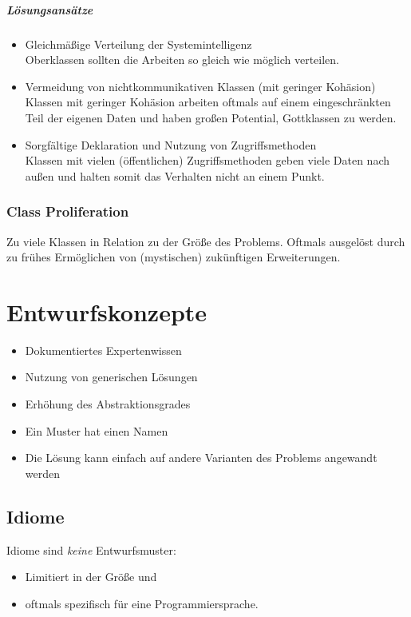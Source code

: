 \documentclass[a4paper, 11pt, accentcolor = tud3b]{tudreport}
\begin{document}
				\paragraph{Lösungsansätze}
					\begin{itemize}
						\item Gleichmäßige Verteilung der Systemintelligenz \\
							  Oberklassen sollten die Arbeiten so gleich wie möglich verteilen.
						\item Vermeidung von nichtkommunikativen Klassen (mit geringer Kohäsion) \\
							  Klassen mit geringer Kohäsion arbeiten oftmals auf einem eingeschränkten Teil der eigenen Daten und haben großen Potential, Gottklassen zu werden.
						\item Sorgfältige Deklaration und Nutzung von Zugriffsmethoden \\
							  Klassen mit vielen (öffentlichen) Zugriffsmethoden geben viele Daten nach außen und halten somit das Verhalten nicht an einem Punkt.
					\end{itemize}
			
			\subsection{Class Proliferation}
				Zu viele Klassen in Relation zu der Größe des Problems. Oftmals ausgelöst durch zu frühes Ermöglichen von (mystischen) zukünftigen Erweiterungen.
	
	\chapter{Entwurfskonzepte}
		\begin{itemize}
			\item Dokumentiertes Expertenwissen
			\item Nutzung von generischen Lösungen
			\item Erhöhung des Abstraktionsgrades
			\item Ein Muster hat einen Namen
			\item Die Lösung kann einfach auf andere Varianten des Problems angewandt werden
		\end{itemize}

		\section{Idiome}
			Idiome sind \textit{keine} Entwurfsmuster:
			\begin{itemize}
				\item Limitiert in der Größe und
				\item oftmals spezifisch für eine Programmiersprache.
			\end{itemize}
		
\end{document}
